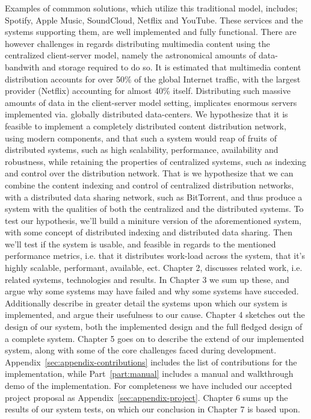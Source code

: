 Examples of commmon solutions, which utilize this traditional model, includes;
Spotify, Apple Music, SoundCloud, Netflix and YouTube.
\newline
These services and the systems supporting them, are well implemented and
fully functional. There are however challenges in regards distributing
multimedia content using the centralized client-server model, namely the 
astronomical amounts of data-bandwith and storage required to do so.
\newline
It is estimated that multimedia content distribution accounts for over 50\% of
the global Internet traffic, with the largest provider (Netflix) accounting for
almost 40\% itself\citep{sandvine:2015}.
\newline
Distributing such massive amounts of data in the client-server model setting, 
implicates enormous servers implemented via. globally distributed data-centers.
\newline\newline
We hypothesize that it is feasible to implement a completely distributed
content distribution network, using modern components, and that such a system
would reap of fruits of distributed systems, such as high scalability, 
performance, availability and robustness, while retaining the properties of 
centralized systems, such as indexing and control over the distribution network.
\newline
That is we hypothesize that we can combine the content indexing and control of
centralized distribution networks, with a distributed data sharing network,
such as BitTorrent, and thus produce a system with the qualities of both the
centralized and the distributed systems.
\newline\newline
To test our hypothesis, we'll build a miniture version of the aforementioned
system, with some concept of distributed indexing and distributed data
sharing.
\newline
Then we'll test if the system is usable, and feasible in regards to the
mentioned performance metrics, i.e. that it distributes work-load across the
system, that it's highly scalable, performant, available, ect.
\newline\newline
Chapter 2, discusses related work, i.e. related systems, technologies and 
results. In Chapter 3 we sum up these, and argue why some systems may have
failed and why some systems have succeded. Additionally describe in greater
detail the systems upon which our system is implemented, and argue their
usefulness to our cause. Chapter 4 sketches out the design of our system, both 
the implemented design and the full fledged design of a complete system.
Chapter 5 goes on to describe the extend of our implemented system, along with
some of the core challenges faced during development.
Appendix~\ref{sec:appendix-contributions} includes the list of contributions for the implementation, while Part~\ref{part:manual} includes a manual and walkthrough demo of the implementation. For
completeness we have included our accepted project proposal as Appendix~\ref{sec:appendix-project}.
Chapter 6 sums up the results of our system tests, on which our conclusion in
Chapter 7 is based upon.
